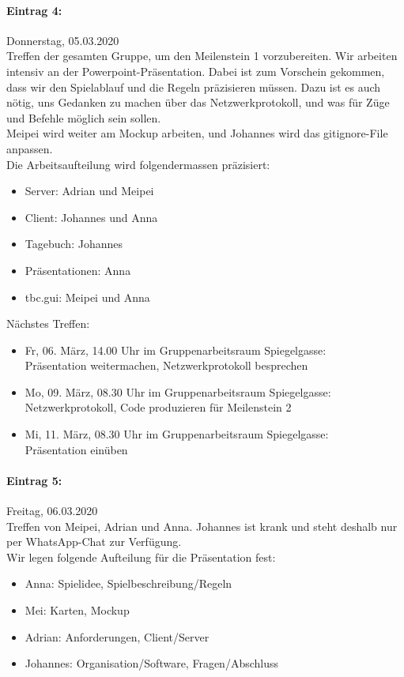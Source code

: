 \documentclass[12pt]{article}
\begin{document}
\paragraph{Eintrag 4:}
Donnerstag, 05.03.2020\\
Treffen der gesamten Gruppe, um den Meilenstein 1 vorzubereiten. Wir arbeiten intensiv an der Powerpoint-Pr\"asentation. Dabei ist zum Vorschein gekommen, dass wir den Spielablauf und die Regeln pr\"azisieren m\"ussen. Dazu ist es auch n\"otig, uns Gedanken zu machen \"uber das Netzwerkprotokoll, und was f\"ur Z\"uge und Befehle m\"oglich sein sollen.\\
Meipei wird weiter am Mockup arbeiten, und Johannes wird das gitignore-File anpassen.\\
Die Arbeitsaufteilung wird folgendermassen pr\"azisiert:
\begin{itemize}
\item Server: Adrian und Meipei
\item Client: Johannes und Anna
\item Tagebuch: Johannes
\item Pr\"asentationen: Anna
\item tbc.gui: Meipei und Anna\\
\end{itemize}

\noindent N\"achstes Treffen:
\begin{itemize}
\item Fr, 06. M\"arz, 14.00 Uhr im Gruppenarbeitsraum Spiegelgasse:\\
Pr\"asentation weitermachen, Netzwerkprotokoll besprechen
\item Mo, 09. M\"arz, 08.30 Uhr im Gruppenarbeitsraum Spiegelgasse:\\
Netzwerkprotokoll, Code produzieren f\"ur Meilenstein 2
\item Mi, 11. M\"arz, 08.30 Uhr im Gruppenarbeitsraum Spiegelgasse:\\
Pr\"asentation ein\"uben
\end{itemize}

\paragraph{Eintrag 5:}
Freitag, 06.03.2020\\
Treffen von Meipei, Adrian und Anna. Johannes ist krank und steht deshalb nur per WhatsApp-Chat zur Verf\"ugung.\\
Wir legen folgende Aufteilung f\"ur die Pr\"asentation fest:
\begin{itemize}
\item Anna: Spielidee, Spielbeschreibung/Regeln
\item Mei: Karten, Mockup
\item Adrian: Anforderungen, Client/Server
\item Johannes: Organisation/Software, Fragen/Abschluss
\end{itemize}
\end{document}

